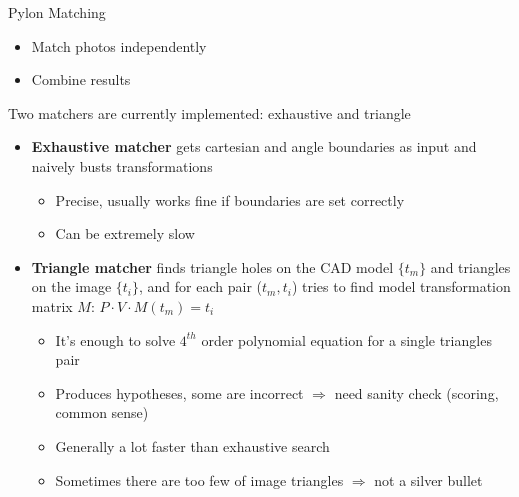 \documentclass{beamer}
\begin{document}
\begin{frame}[t, fragile]{Pylon Matching}
\begin{itemize} 
\item Match photos independently
\item Combine results
\end{itemize}

Two matchers are currently implemented: exhaustive and triangle
\begin{itemize} 
\item \textbf{Exhaustive matcher} gets cartesian and angle boundaries as input and naively busts transformations   
\begin{itemize} 
\item Precise, usually works fine if boundaries are set correctly
\item Can be extremely slow
\end{itemize} 
\item \textbf{Triangle matcher} finds triangle holes on the CAD model $\{t_m\}$ and triangles on the image $\{t_i\}$, and for each pair ($t_m, t_i$) tries to find model transformation matrix $M$: $P \cdot V \cdot M(t_m) = t_i$   
\begin{itemize}
\item It's enough to solve $4^{th}$ order polynomial equation for a single triangles pair
\item Produces hypotheses, some are incorrect $\Rightarrow$ need sanity check (scoring, common sense)
\item Generally a lot faster than exhaustive search
\item Sometimes there are too few of image triangles $\Rightarrow$ not a silver bullet
 
\end{itemize}
\end{itemize}

\end{frame}
\end{document}
